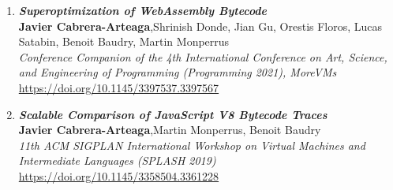 \begin{enumerate}[I]
	\item \textbf{\textit{Superoptimization of WebAssembly Bytecode}} \\
    \textbf{Javier Cabrera-Arteaga},Shrinish Donde, Jian Gu, Orestis Floros, Lucas Satabin, Benoit Baudry, Martin Monperrus\\
    \textit{Conference Companion of the 4th International Conference on Art, Science, and Engineering of Programming (Programming 2021), MoreVMs} \\
    \url{https://doi.org/10.1145/3397537.3397567}
    \item \textbf{\textit{Scalable Comparison of JavaScript V8 Bytecode Traces}} \\
        \textbf{Javier Cabrera-Arteaga},Martin Monperrus, Benoit Baudry\\
        \textit{11th ACM SIGPLAN International Workshop on Virtual Machines and Intermediate Languages (SPLASH 2019)} \\
        \url{https://doi.org/10.1145/3358504.3361228}
\end{enumerate}


